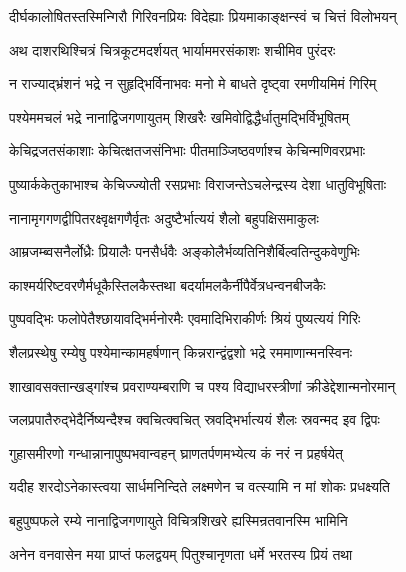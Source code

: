 
\twolineshloka
{दीर्घकालोषितस्तस्मिन्गिरौ गिरिवनप्रियः}
{विदेह्याः प्रियमाकाङ्क्षन्स्वं च चित्तं विलोभयन्} %

\twolineshloka
{अथ दाशरथिश्चित्रं चित्रकूटमदर्शयत्}
{भार्याममरसंकाशः शचीमिव पुरंदरः} %

\twolineshloka
{न राज्याद्भ्रंशनं भद्रे न सुहृद्भिर्विनाभवः}
{मनो मे बाधते दृष्ट्वा रमणीयमिमं गिरिम्} %

\twolineshloka
{पश्येममचलं भद्रे नानाद्विजगणायुतम्}
{शिखरैः खमिवोद्विद्धैर्धातुमद्भिर्विभूषितम्} %

\twolineshloka
{केचिद्रजतसंकाशाः केचित्क्षतजसंनिभाः}
{पीतमाञ्जिष्ठवर्णाश्च केचिन्मणिवरप्रभाः} %

\twolineshloka
{पुष्यार्ककेतुकाभाश्च केचिज्ज्योती रसप्रभाः}
{विराजन्तेऽचलेन्द्रस्य देशा धातुविभूषिताः} %

\twolineshloka
{नानामृगगणद्वीपितरक्ष्वृक्षगणैर्वृतः}
{अदुष्टैर्भात्ययं शैलो बहुपक्षिसमाकुलः} %

\twolineshloka
{आम्रजम्ब्वसनैर्लोध्रैः प्रियालैः पनसैर्धवैः}
{अङ्कोलैर्भव्यतिनिशैर्बिल्वतिन्दुकवेणुभिः} %

\twolineshloka
{काश्मर्यरिष्टवरणैर्मधूकैस्तिलकैस्तथा}
{बदर्यामलकैर्नीपैर्वेत्रधन्वनबीजकैः} %

\twolineshloka
{पुष्पवद्भिः फलोपेतैश्छायावद्भिर्मनोरमैः}
{एवमादिभिराकीर्णः श्रियं पुष्यत्ययं गिरिः} %

\twolineshloka
{शैलप्रस्थेषु रम्येषु पश्येमान्कामहर्षणान्}
{किन्नरान्द्वंद्वशो भद्रे रममाणान्मनस्विनः} %

\twolineshloka
{शाखावसक्तान्खड्गांश्च प्रवराण्यम्बराणि च}
{पश्य विद्याधरस्त्रीणां क्रीडेद्देशान्मनोरमान्} %

\twolineshloka
{जलप्रपातैरुद्भेदैर्निष्यन्दैश्च क्वचित्क्वचित्}
{स्रवद्भिर्भात्ययं शैलः स्रवन्मद इव द्विपः} %

\twolineshloka
{गुहासमीरणो गन्धान्नानापुष्पभवान्वहन्}
{घ्राणतर्पणमभ्येत्य कं नरं न प्रहर्षयेत्} %

\twolineshloka
{यदीह शरदोऽनेकास्त्वया सार्धमनिन्दिते}
{लक्ष्मणेन च वत्स्यामि न मां शोकः प्रधक्ष्यति} %

\twolineshloka
{बहुपुष्पफले रम्ये नानाद्विजगणायुते}
{विचित्रशिखरे ह्यस्मिन्रतवानस्मि भामिनि} %

\twolineshloka
{अनेन वनवासेन मया प्राप्तं फलद्वयम्}
{पितुश्चानृणता धर्मे भरतस्य प्रियं तथा} %

